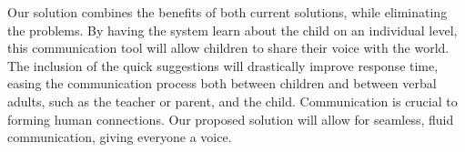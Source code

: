 Our solution combines the benefits of both current solutions, while eliminating the problems. By having the system learn about the child on an individual level, this communication tool will allow children to share their voice with the world. The inclusion of the quick suggestions will drastically improve response time, easing the communication process both between children and between verbal adults, such as the teacher or parent, and the child. Communication is crucial to forming human connections. Our proposed solution will allow for seamless, fluid communication, giving everyone a voice.
